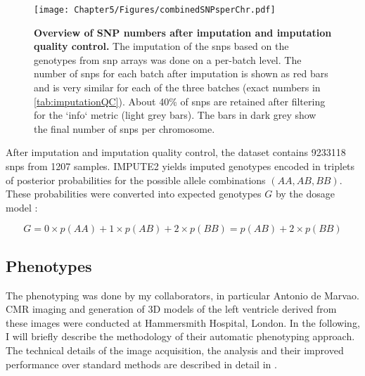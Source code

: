 \begin{figure}[hbtp]
	\centering
	\texttt{[image: Chapter5/Figures/combinedSNPsperChr.pdf]}
	\caption[\textbf{Overview of SNP numbers after imputation and imputation quality control. }]{\textbf{Overview of SNP numbers after imputation and imputation quality control. } The imputation of the \glspl{snp} based on the genotypes from \gls{snp} arrays was done on a per-batch level. The number of \glspl{snp} for each batch after imputation is shown as red bars and is very similar for each of the three batches (exact numbers in \cref{tab:imputationQC}). About \num{40}\% of \glspl{snp} are retained after filtering for the `info` metric (light grey bars). The bars in dark grey show the final number of \glspl{snp} per chromosome. }
 	\label{fig:imputeQC}
\end{figure}
%
After imputation and imputation quality control, the dataset contains \num{9233118} \glspl{snp} from \num{1207} samples. IMPUTE2 yields imputed genotypes encoded in triplets of posterior probabilities for the possible allele combinations \((AA, AB, BB)\). These probabilities were converted into expected genotypes \(G\) by the dosage model \citep{Howie2011}:

\begin{equation}
	G = 0 \times p(AA) + 1 \times p(AB) + 2 \times p(BB) = p(AB) + 2 \times p(BB)
\end{equation}


\subsection{Phenotypes}
\label{subsection:phentoypes}
The phenotyping was done by my collaborators, in particular Antonio de Marvao. CMR imaging and generation of 3D models of the left ventricle derived from these images were conducted at Hammersmith Hospital, London. In the following, I will briefly describe the methodology of their automatic phenotyping approach. The technical details of the image acquisition, the analysis and their improved performance over standard methods are described in detail in \citep{deMarvao2014}. 

